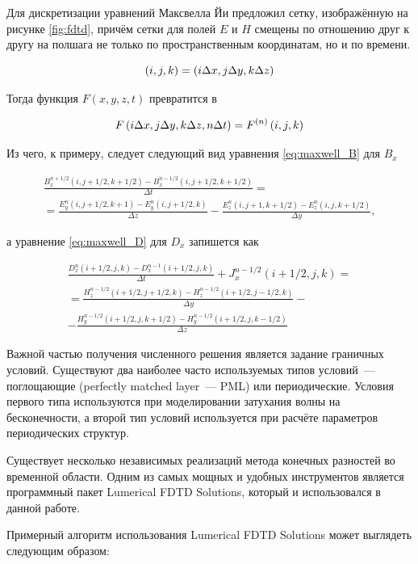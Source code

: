 Для дискретизации уравнений Максвелла Йи предложил сетку, изображённую на рисунке \ref{fig:fdtd}, причём сетки для полей $E$ и $H$ смещены по отношению друг к другу на полшага не только по пространственным координатам, но и по времени.

\begin{equation}
  \left( i, j, k \right) = \left( i\Delta x, j\Delta y, k\Delta z \right)
\end{equation}

Тогда функция $F(x, y, z, t)$ превратится в

\begin{equation}
  F\left( i\Delta x, j\Delta y, k\Delta z, n\Delta t \right) = F^{(n)}\left( i,j,k \right) 
\end{equation}

Из чего, к примеру, следует следующий вид уравнения \ref{eq:maxwell_B} для $B_x$

\begin{multline}
	\frac{B_x^{n+1/2}(i,j+1/2,k+1/2)-B_x^{n-1/2}(i,j+1/2,k+1/2)}{\Delta t} = \\
	= \frac{E_y^n(i, j+1/2,k+1) - E_y^n(i, j+1/2,k)}{\Delta z} - \frac{E_z^n(i, j+1,k+1/2) - E_z^n(i,j,k+1/2)}{\Delta y},
\end{multline}

а уравнение \ref{eq:maxwell_D} для $D_x$ запишется как

\begin{multline}
	\frac{D_x^n(i+1/2,j,k) - D_x^{n-1}(i+1/2,j,k)}{\Delta t} + J_x^{n-1/2}(i+1/2,j,k)= \\
	= \frac{H_z^{n-1/2}(i+1/2,j+1/2,k) - H_z^{n-1/2}(i+1/2,j-1/2,k)}{\Delta y} - \\
	- \frac{H_y^{n-1/2}(i+1/2,j,k+1/2) - H_y^{n-1/2}(i+1/2,j,k-1/2)}{\Delta z}
\end{multline}

Важной частью получения численного решения является задание граничных условий. Существуют два наиболее часто используемых типов условий~--- поглощающие (perfectly matched layer~--- PML) или периодические. Условия первого типа используются при моделировании затухания волны на бесконечности, а второй тип условий используется при расчёте параметров периодических структур.

Существует несколько независимых реализаций метода конечных разностей во временной области. Одним из самых мощных и удобных инструментов является программный пакет Lumerical FDTD Solutions, который и использовался в данной работе.

Примерный алгоритм использования Lumerical FDTD Solutions может выглядеть следующим образом:

